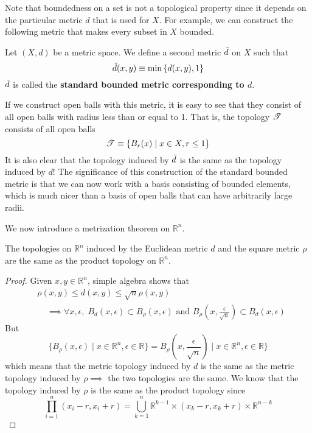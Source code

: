   Note that boundedness on a set is not a topological property since it depends on the particular metric $d$ that is used for $X$. For example, we can construct the following metric that makes every subset in $X$ bounded. 

  \begin{definition}
    Let $(X, d)$ be a metric space. We define a second metric $\Tilde{d}$ on $X$ such that
    \begin{equation}
      \Tilde{d} (x, y) \equiv \min{\{d(x, y), 1\}}
    \end{equation}
    $\Tilde{d}$ is called the \textbf{standard bounded metric corresponding to $d$}. 
  \end{definition}

  If we construct open balls with this metric, it is easy to see that they consist of all open balls with radius less than or equal to 1. That is, the topology $\T$ consists of all open balls
  \begin{equation}
    \T \equiv \{B_r (x) \mid x \in X, r \leq 1\}
  \end{equation}
  It is also clear that the topology induced by $\Tilde{d}$ is the same as the topology induced by $d$! The significance of this construction of the standard bounded metric is that we can now work with a basis consisting of bounded elements, which is much nicer than a basis of open balls that can have arbitrarily large radii.  

  We now introduce a metrization theorem on $\mathbb{R}^n$. 

  \begin{theorem}
    The topologies on $\mathbb{R}^n$ induced by the Euclidean metric $d$ and the square metric $\rho$ are the same as the product topology on $\mathbb{R}^n$. 
  \end{theorem}
  \begin{proof}
    Given $x, y \in \mathbb{R}^n$, simple algebra shows that 
    \begin{align*}
      & \rho(x, y) \leq d(x, y) \leq \sqrt{n} \rho(x, y) \\
      & \;\;\;\; \implies \forall x, \epsilon, \; B_d (x, \epsilon) \subset B_\rho (x, \epsilon) \text{ and } B_\rho (x, \frac{\epsilon}{\sqrt{n}}) \subset B_d (x, \epsilon)
    \end{align*}
    But
    \begin{equation}
      \{ B_\rho (x, \epsilon) \mid x \in \mathbb{R}^n, \epsilon \in \mathbb{R}\} = B_\rho (x, \frac{\epsilon}{\sqrt{n}}) \mid x \in \mathbb{R}^n, \epsilon \in \mathbb{R}\}
    \end{equation}
    which means that the metric topology induced by $d$ is the same as the metric topology induced by $\rho \implies$ the two topologies are the same. We know that the topology induced by $\rho$ is the same as the product topology since 
    \begin{equation}
      \prod_{i=1}^n (x_i - r, x_i + r) = \bigcup_{k=1}^n \mathbb{R}^{k-1} \times (x_k - r, x_k + r) \times \mathbb{R}^{n-k}
    \end{equation}
  \end{proof}

